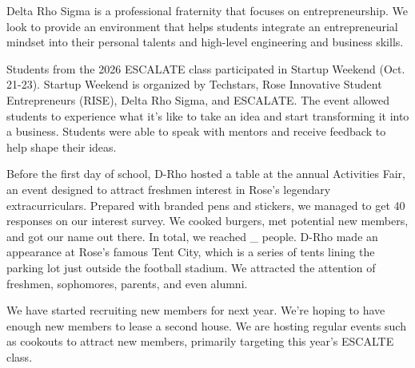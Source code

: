 \begin{minipage}[t]{.66\linewidth} %


Delta Rho Sigma is a professional fraternity that focuses on entrepreneurship. We look to provide an environment that helps students integrate an entrepreneurial mindset into their personal talents and high-level engineering and business skills.



Students from the 2026 ESCALATE class participated in Startup Weekend (Oct. 21-23). Startup Weekend is organized by Techstars, Rose Innovative Student Entrepreneurs (RISE), Delta Rho Sigma, and ESCALATE. The event allowed students to experience what it's like to take an idea and start transforming it into a business. Students were able to speak with mentors and receive feedback to help shape their ideas.



Before the first day of school, D-Rho hosted a table at the annual Activities Fair, an event designed to attract freshmen interest in Rose's legendary extracurriculars. Prepared with branded pens and stickers, we managed to get 40 responses on our interest survey.
We cooked burgers, met potential new members, and got our name out there. In total, we reached \_ people. 
D-Rho made an appearance at Rose's famous Tent City, which is a series of tents lining the parking lot just outside the football stadium. We attracted the attention of freshmen, sophomores, parents, and even alumni. 



We have started recruiting new members for next year. We're hoping to have enough new members to lease a second house. We are hosting regular events such as cookouts to attract new members, primarily targeting this year's ESCALTE class.


\end{minipage}
